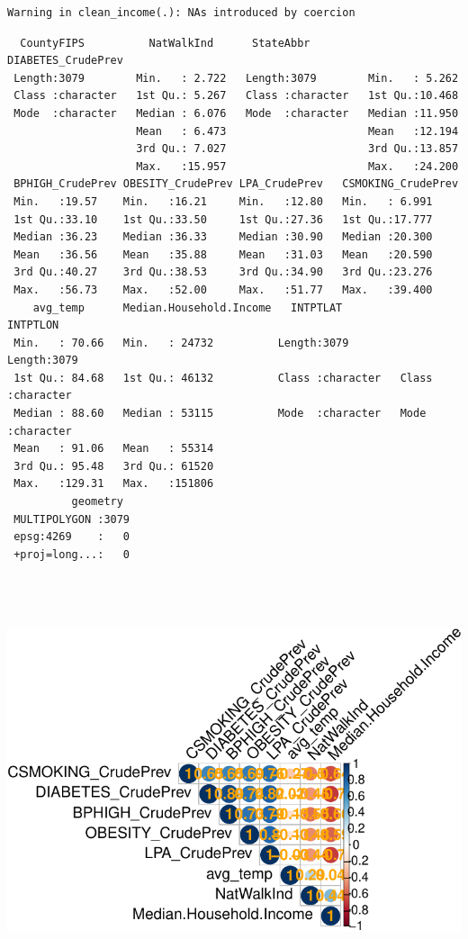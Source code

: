 \documentclass[
]{article}
\begin{document}
\begin{verbatim}
Warning in clean_income(.): NAs introduced by coercion
\end{verbatim}

\begin{verbatim}
  CountyFIPS          NatWalkInd      StateAbbr         DIABETES_CrudePrev
 Length:3079        Min.   : 2.722   Length:3079        Min.   : 5.262    
 Class :character   1st Qu.: 5.267   Class :character   1st Qu.:10.468    
 Mode  :character   Median : 6.076   Mode  :character   Median :11.950    
                    Mean   : 6.473                      Mean   :12.194    
                    3rd Qu.: 7.027                      3rd Qu.:13.857    
                    Max.   :15.957                      Max.   :24.200    
 BPHIGH_CrudePrev OBESITY_CrudePrev LPA_CrudePrev   CSMOKING_CrudePrev
 Min.   :19.57    Min.   :16.21     Min.   :12.80   Min.   : 6.991    
 1st Qu.:33.10    1st Qu.:33.50     1st Qu.:27.36   1st Qu.:17.777    
 Median :36.23    Median :36.33     Median :30.90   Median :20.300    
 Mean   :36.56    Mean   :35.88     Mean   :31.03   Mean   :20.590    
 3rd Qu.:40.27    3rd Qu.:38.53     3rd Qu.:34.90   3rd Qu.:23.276    
 Max.   :56.73    Max.   :52.00     Max.   :51.77   Max.   :39.400    
    avg_temp      Median.Household.Income   INTPTLAT           INTPTLON        
 Min.   : 70.66   Min.   : 24732          Length:3079        Length:3079       
 1st Qu.: 84.68   1st Qu.: 46132          Class :character   Class :character  
 Median : 88.60   Median : 53115          Mode  :character   Mode  :character  
 Mean   : 91.06   Mean   : 55314                                               
 3rd Qu.: 95.48   3rd Qu.: 61520                                               
 Max.   :129.31   Max.   :151806                                               
          geometry   
 MULTIPOLYGON :3079  
 epsg:4269    :   0  
 +proj=long...:   0  
                     
                     
                     
\end{verbatim}

\includegraphics{report_files/figure-pdf/unnamed-chunk-5-1.pdf}
\end{document}
